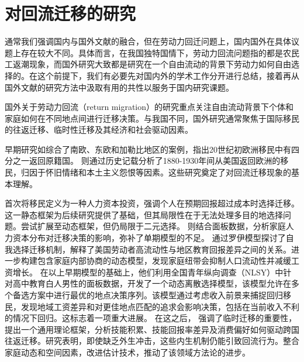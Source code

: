 \documentclass[a4paper, zihao=-4, fontset = mac, oneside]{ctexbook} %
\begin{document}
\section{对回流迁移的研究}

通常我们强调国内与国外文献的融合，但在劳动力回迁问题上，国内国外在具体议题上存在较大不同。具体而言，在我国独特国情下，劳动力回流问题指的都是农民工返潮现象，而国外研究大致都是研究在一个自由流动的背景下劳动力如何自由选择的。在这个前提下，我们有必要先对国内外的学术工作分开进行总结，接着再从国外文献的研究方法中汲取有用的共性以服务于国内研究课题。


国外关于劳动力回流（return migration）的研究重点关注自由流动背景下个体和家庭如何在不同地点间进行迁移决策。与我国不同，国外研究通常聚焦于国际移民的往返迁移、临时性迁移及其经济和社会驱动因素。

早期研究如\textcite{gmelchReturnMigration1980}综合了南欧、东欧和加勒比地区的案例，指出20世纪初欧洲移民中有四分之一返回原籍国。
\textcite{wymanRoundtripAmericaImmigrants1993}则通过历史记载分析了1880-1930年间从美国返回欧洲的移民，归因于怀旧情绪和本土主义怨恨等因素。这些研究奠定了对回流迁移现象的基本理解。

\textcite{sjaastadCostsReturnsHuman1962}首次将移民定义为一种人力资本投资，强调个人在预期回报超过成本时选择迁移。这一静态框架为后续研究提供了基础，但其局限性在于无法处理多目的地选择问题。\textcite{tunaliRationalityMigration2000}尝试扩展至动态框架，但仍局限于二元选择。
\textcite{dierxLifecycleModelRepeat1988}则结合面板数据，分析家庭人力资本分布对迁移决策的影响，弥补了单期模型的不足。
\textcite{dahlMobilityReturnEducation2002} 通过罗伊模型探讨了自我选择迁移机制，解释了美国劳动者高流动性与地区教育回报差异之间的关系。\textcite{gemiciFamilyMigrationLabor2007}进一步构建包含家庭内部协商的动态模型，发现家庭纽带会抑制人口流动性并减缓工资增长。
在以上早期模型的基础上，\textcite{kennanEffectExpectedIncome2011}他们利用全国青年纵向调查（NLSY）中针对高中教育白人男性的面板数据，开发了一个动态离散选择模型，该模型允许在多个备选方案中进行最优的地点决策序列。该模型通过考虑收入前景来捕捉回归移民，发现地域工资差异和对更佳地点匹配的追求会影响决策，包括在当前收入不利的情况下回归。这标志着一项重大进展。
在这之后，
\textcite{dustmannEconomicsTemporaryMigrations2016}强调了临时迁移的重要性，提出一个通用理论框架，分析技能积累、技能回报率差异及消费偏好如何驱动跨国往返迁移。研究表明，即使缺乏外生冲击，这些内生机制仍能引致回流行为。\textcite{venatorDualEarnerMigrationDecisions2022}整合家庭动态和空间因素，改进估计技术，推动了该领域方法论的进步。
\end{document}
